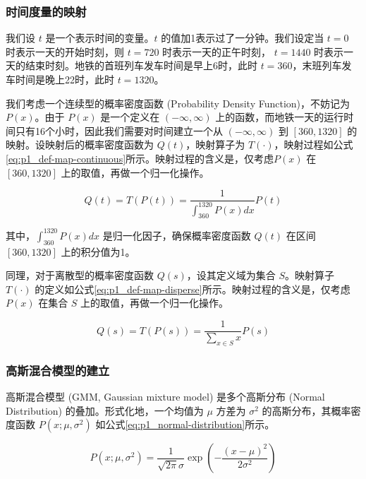 \documentclass[12pt,a4paper]{mcmthesis}
\begin{document}
\subsubsection{时间度量的映射}

我们设 $t$ 是一个表示时间的变量。$t$ 的值加1表示过了一分钟。我们设定当 $t=0$ 时表示一天的开始时刻，则 $t=720$ 时表示一天的正午时刻， $t=1440$ 时表示一天的结束时刻。地铁的首班列车发车时间是早上6时，此时 $t=360$，末班列车发车时间是晚上22时，此时 $t=1320$。

我们考虑一个连续型的概率密度函数 (Probability Density Function)，不妨记为 $P(x)$。由于 $P(x)$ 是一个定义在 $(-\infty,\infty)$ 上的函数，而地铁一天的运行时间只有16个小时，因此我们需要对时间建立一个从 $(-\infty,\infty)$ 到 $[360,1320]$ 的映射。设映射后的概率密度函数为 $Q(t)$，映射算子为 $T(\cdot)$，映射过程如公式\ref{eq:p1_def-map-continuous}所示。映射过程的含义是，仅考虑$P(x)$ 在 $[360,1320]$ 上的取值，再做一个归一化操作。

\begin{equation}
    Q(t) = T(P(t)) = \frac{1}{\int_{360}^{1320}P(x)dx} P(t)
    \label{eq:p1_def-map-continuous}
\end{equation}

其中，$\int_{360}^{1320}P(x)dx$ 是归一化因子，确保概率密度函数 $Q(t)$ 在区间 $[360,1320]$ 上的积分值为1。

同理，对于离散型的概率密度函数 $Q(s)$，设其定义域为集合 $S$。映射算子 $T(\cdot)$ 的定义如公式\ref{eq:p1_def-map-disperse}所示。映射过程的含义是，仅考虑$P(x)$ 在集合 $S$ 上的取值，再做一个归一化操作。

\begin{equation}
    Q(s) = T(P(s)) = \frac{1}{\sum_{x \in S} x} P(s)
    \label{eq:p1_def-map-disperse}
\end{equation}

\subsubsection{高斯混合模型的建立}

高斯混合模型 (GMM, Gaussian mixture model) 是多个高斯分布 (Normal Distribution) 的叠加。形式化地，一个均值为 $\mu$ 方差为 $\sigma^2$ 的高斯分布，其概率密度函数 $P(x;\mu,\sigma^2)$ 如公式\ref{eq:p1_normal-distribution}所示。

\begin{equation}
    P(x;\mu,\sigma^2) = \frac{1}{\sqrt{2\pi}\sigma} \exp \left( - \frac{(x-\mu)^2}{2\sigma^2} \right)
    \label{eq:p1_normal-distribution}
\end{equation}
\end{document}
